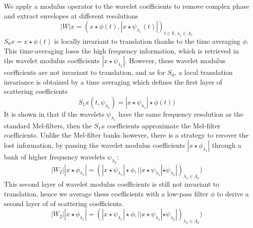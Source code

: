 We apply a modulus operator to the wavelet coefficients to remove complex phase and extract envelopes at different resolutions
\begin{equation}
|W|x=\left(x\star\phi(t),|x\star\psi_{\lambda_1}(t)|\right)_{t\in\mathbb{R},\lambda_1\in\Lambda_1} \label{eqn_c4_dss02}
\end{equation}
$S_0x=x\star\phi(t)$ is locally invariant to translation thanks to the time averaging $\phi$.  This time-averaging loses the high frequency information, which is retrieved in the wavelet modulus coefficients $|x\star\psi_{\lambda_1}|$.  However, these wavelet modulus coefficients are not invariant to translation, and as for $S_0$, a local translation invariance is obtained by a time averaging which defines the first layer of scattering coefficients
\begin{equation}
S_1x(t,\psi_{\lambda_1})=|x \star\psi_{\lambda_1}| \star\phi(t)\label{eqn_c4_dss03})
\end{equation}
It is shown in \cite{anden2014deep} that if the wavelets $\psi_{\lambda_1}$ have the same frequency resolution as the standard Mel-filters, then the $S_1x$ coefficients approximate the Mel-filter coefficients.  Unlike the Mel-filter banks however, there is a strategy to recover the lost information, by passing the wavelet modulus coefficients  $|x\star\phi_{\lambda_1}|$ through a bank of higher frequency wavelets $\psi_{\lambda_2}$:
\begin{equation}
|W_2||x\star\phi_{\lambda_1}|=\left(|x\star\psi_{\lambda_1}|\star\phi,||x\star\psi_{\lambda_1}|\star\psi_{\lambda_2}|\right)_{\lambda_2\in\Lambda_2} \label{eqn_c4_dss04})\end{equation}
This second layer of wavelet modulus coefficients is still not invariant to translation, hence we average these coefficients with a low-pass filter $\phi$ to derive a second layer of of scattering coefficients.
 \begin{equation}
|W_2||x\star\phi_{\lambda_1}|=\left(|x\star\psi_{\lambda_1}|\star\phi,||x\star\psi_{\lambda_1}|\star\psi_{\lambda_2}|\right)_{\lambda_2\in\Lambda_2}\label{eqn_c4_dss04})\end{equation}


